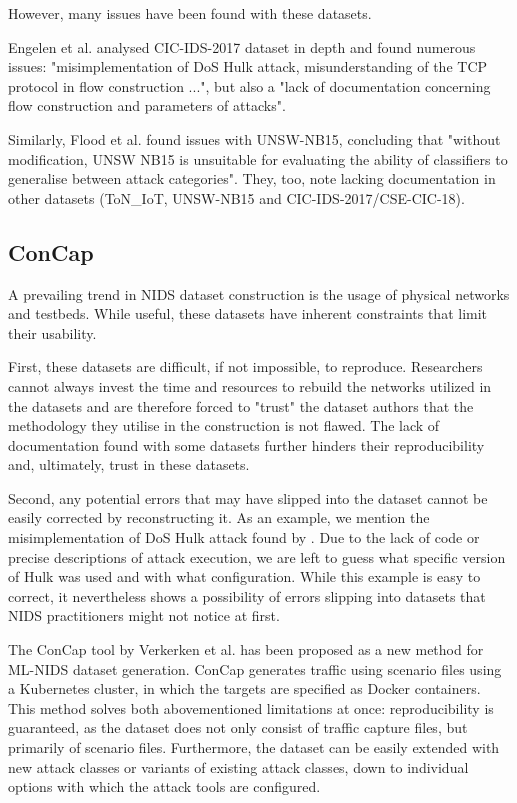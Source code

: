 However, many issues have been found with these datasets. 

Engelen et al. \cite{troubleshooting_cic2017} analysed CIC-IDS-2017 dataset in depth and found numerous issues: "misimplementation of DoS Hulk attack, misunderstanding of the TCP protocol in flow construction ...", but also a "lack of documentation concerning flow construction and parameters of attacks".  

Similarly, Flood et al. \cite{bad_design_smells} found issues with UNSW-NB15, concluding that "without modification, UNSW NB15 is unsuitable for evaluating the ability of classifiers to generalise between attack categories". They, too, note lacking documentation in other datasets (ToN\_IoT, UNSW-NB15 and CIC-IDS-2017/CSE-CIC-18).

\subsection{ConCap}
A prevailing trend in NIDS dataset construction is the usage of physical networks and testbeds. While useful, these datasets have inherent constraints that limit their usability. 

First, these datasets are difficult, if not impossible, to reproduce. Researchers cannot always invest the time and resources to rebuild the networks utilized in the datasets and are therefore forced to "trust" the dataset authors that the methodology they utilise in the construction is not flawed. The lack of documentation found with some datasets further hinders their reproducibility and, ultimately, trust in these datasets.

Second, any potential errors that may have slipped into the dataset cannot be easily corrected by reconstructing it. As an example, we mention the misimplementation of DoS Hulk attack found by \cite{troubleshooting_cic2017}. Due to the lack of code or precise descriptions of attack execution, we are left to guess what specific version of Hulk was used and with what configuration. While this example is easy to correct, it nevertheless shows a possibility of errors slipping into datasets that NIDS practitioners might not notice at first. 

The ConCap tool by Verkerken et al. \cite{concap} has been proposed as a new method for ML-NIDS dataset generation. ConCap generates traffic using scenario files using a Kubernetes cluster, in which the targets are specified as Docker containers. This method solves both abovementioned limitations at once: reproducibility is guaranteed, as the dataset does not only consist of traffic capture files, but primarily of scenario files. Furthermore, the dataset can be easily extended with new attack classes or variants of existing attack classes, down to individual options with which the attack tools are configured. 

